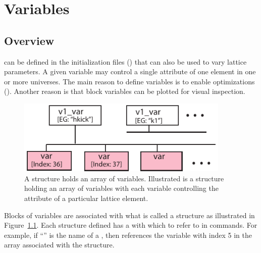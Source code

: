 \chapter{Variables}
\label{c:var}

\section{Overview}
\label{s:var.overview}

 can be defined in the \tao initialization files () that can also be
used to vary  lattice parameters. A given \tao variable may control a single attribute of
one element in one or more universes. The main reason to define variables is to enable optimizations
(). Another reason is that block variables can be plotted for visual inspection.

\begin{figure}
  \centering
  \includegraphics[width=4in]{var-tree.pdf}
  \caption[VAriable tree structure]
{A  structure holds an array of variables. Illustrated is a  structure
holding an array of variables with each variable controlling the  attribute of a
particular lattice element.}
  \label{f:var.tree}
\end{figure}


Blocks of variables are associated with what is called a  structure as illustrated in
Figure~\ref{f:var.tree}. Each  structure defined has a  with which to refer to
in \tao commands. For example, if ``'' is the name of a , then
 references the variable with index 5 in the array associated with the 
 structure.

